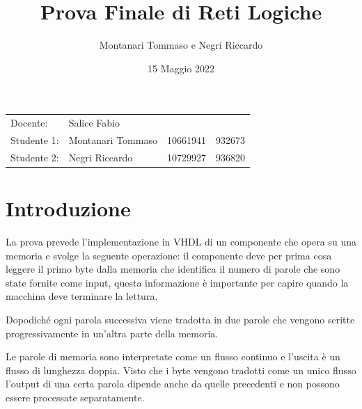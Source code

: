 \documentclass{article}
\title{Prova Finale di Reti Logiche} %
\author{Montanari Tommaso e Negri Riccardo} %
\date{15 Maggio 2022}
\begin{document}
\maketitle %
\begin{center}
\begin{tabular}{l l l l}
Docente: & Salice Fabio & & \\ 
Studente 1: & Montanari Tommaso & 10661941 & 932673\\
Studente 2: & Negri Riccardo & 10729927 & 936820 
\end{tabular}
\end{center}


\section{Introduzione}

La prova prevede l'implementazione in VHDL di un componente che opera su una memoria e svolge la seguente operazione: il componente deve per prima cosa leggere il primo byte dalla memoria che identifica il numero di parole che sono
state fornite come input, questa informazione è importante per capire quando la macchina deve terminare la lettura.

Dopodiché ogni parola successiva viene tradotta in due parole che vengono scritte progressivamente in un'altra parte della memoria.

Le parole di memoria sono interpretate come un flusso continuo e l'uscita è un flusso di lunghezza doppia. Visto che i byte vengono tradotti come un unico flusso l'output di una certa parola dipende anche da quelle precedenti e non possono essere processate separatamente.
\end{document}
